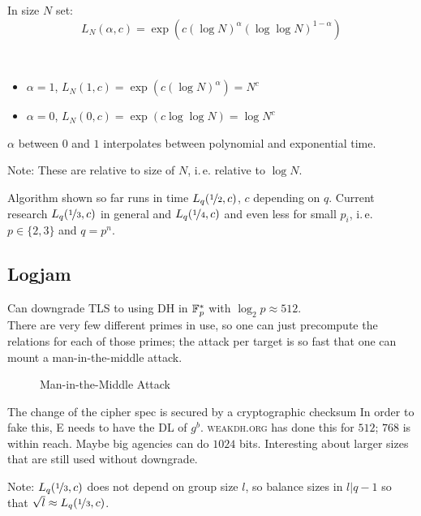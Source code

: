 \begin{definition}[L-Notation]
In size $N$ set:
\[ L_N (\alpha,c) = \exp(c(\log N)^{\alpha}(\log \log N)^{1 - \alpha}) \]
\end{definition}

\begin{example}\ \\
\begin{itemize}
\item $\alpha = 1$, $L_N(1,c) = \exp (c(\log N)^{\alpha}) = N^c$
\item $\alpha = 0$, $L_N(0,c) = \exp (c\log \log N) = \log N^c$
\end{itemize}
$\alpha$ between $0$ and $1$ interpolates between polynomial and exponential time.
\end{example}

Note: These are relative to size of $N$, i.\,e. relative to $\log N$.

Algorithm shown so far runs in time $L_q(\nicefrac{1}{2},c)$, $c$ depending on $q$. Current research $L_q(\nicefrac{1}{3},c)$ in general and $L_q(\nicefrac{1}{4},c)$ and even less for small $p_i$, i.\,e. $p \in \{2, 3\}$ and $q = p^n$.

\subsection{Logjam}

Can downgrade \textsc{TLS} to using \textsc{DH} in $\mathbb{F}_p^{\ast}$ with $\log_2 p \approx 512$. \\

There are very few different primes in use, so one can just precompute the relations for each of those primes; the attack per target is so fast that one can mount a man-in-the-middle attack.

\begin{figure}[H]
  \caption{Man-in-the-Middle Attack}
  \label{fig:MITM}
\end{figure}

The change of the cipher spec is secured by a cryptographic checksum In order to fake this, \textsc{E} needs to have the \textsc{DL} of $g^b$. \textsc{weakdh.org} has done this for $512$; $768$ is within reach. Maybe big agencies can do $1024$ bits. Interesting about larger sizes that are still used without downgrade.

Note: $L_q(\nicefrac{1}{3},c)$ does not depend on group size $l$, so balance sizes in $l|q-1$ so that $\sqrt{l} \approx L_q(\nicefrac{1}{3},c)$. \\

